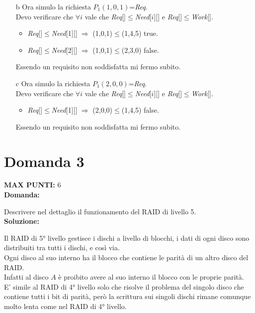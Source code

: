 \documentclass{article}
\begin{document}
\begin{itemize}
\begin{itemize}
               (1,4,5) $\le$ (4,3,3) false $\Rightarrow$ ++i\\
               (2,2,0) $\le$ (4,3,3) true $\Rightarrow$ \emph{Work}=\emph{Work}+\emph{ALLOC}[$P_C$]=(5,5,7).
            \item terza iterazione\\
               (1,4,5) $\le$ (5,5,7) true $\Rightarrow$ \emph{Work}=\emph{Work}+\emph{ALLOC}[$P_A$]=(7,7,10).
         \end{itemize}
         Ho concluso tutte le iterazioni servendo per ogni iterazione un processo, quindi sono in uno stato safe.\\
      \item[b] Ora simulo la richiesta $P_1(1,0,1)$=\emph{Req}.\\
         Devo verificare che $\forall i$ vale che \emph{Req}[]$\le$\emph{Need}[$i$][] e \emph{Req}[]$\le$\emph{Work}[].
         \begin{itemize}
            \item \emph{Req}[]$\le$\emph{Need}[1][] $\Rightarrow$ (1,0,1)$\le$(1,4,5) true.
            \item \emph{Req}[]$\le$\emph{Need}[2][] $\Rightarrow$ (1,0,1)$\le$(2,3,0) false.
         \end{itemize}
         Essendo un requisito non soddisfatta mi fermo subito.
      \item[c] Ora simulo la richiesta $P_1(2,0,0)$=\emph{Req}.\\
         Devo verificare che $\forall i$ vale che \emph{Req}[]$\le$\emph{Need}[$i$][] e \emph{Req}[]$\le$\emph{Work}[].
         \begin{itemize}
            \item \emph{Req}[]$\le$\emph{Need}[1][] $\Rightarrow$ (2,0,0)$\le$(1,4,5) false.
         \end{itemize}
         Essendo un requisito non soddisfatta mi fermo subito.
   \end{itemize}
   \section*{Domanda 3}
   \textbf{MAX PUNTI:} 6\\
   \textbf{Domanda:}


   Descrivere nel dettaglio il funzionamento del RAID di livello 5.\\
   \textbf{Soluzione:}


   Il RAID di 5° livello gestisce i dischi a livello di blocchi, i dati di ogni disco sono distribuiti tra tutti i dischi, e così via.\\
   Ogni disco al suo interno ha il blocco che contiene le parità di un altro disco del RAID.\\
   Infatti al disco $A$ è proibito avere al suo interno il blocco con le proprie parità.\\
   E' simile al RAID di 4° livello solo che risolve il problema del singolo disco che contiene tutti i bit di parità, però la scrittura sui singoli dischi rimane comunque molto lenta come nel RAID di 4° livello.
\end{document}

